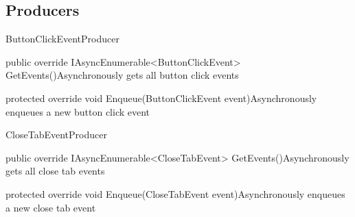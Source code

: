 \subsection*{Producers}

\begin{class}{ButtonClickEventProducer} 
    


    \begin{methods}
        \begin{method}{public override IAsyncEnumerable<ButtonClickEvent> GetEvents()}{Asynchronously gets all button click events}
        \end{method}
        \begin{method}{ protected override void Enqueue(ButtonClickEvent event)}{Asynchronously enqueues a new button click event}
            \begin{parameters}
            \end{parameters}
        \end{method}
    \end{methods}
\end{class}

\begin{class}{CloseTabEventProducer} 
    


    \begin{methods}
        \begin{method}{public override IAsyncEnumerable<CloseTabEvent> GetEvents()}{Asynchronously gets all close tab events}
        \end{method}
        \begin{method}{ protected override void Enqueue(CloseTabEvent event)}{Asynchronously enqueues a new close tab event}
            \begin{parameters}
            \end{parameters}
        \end{method}
    \end{methods}
\end{class}

